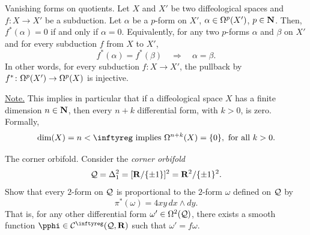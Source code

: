 \begin{Article}{Vanishing forms on quotients.}{}
  Let $X$ and $X'$ be two diffeological spaces and $f \colon X \to X'$ be a subduction.
  Let $\alpha$ be a $p$-form on $X'$,
  $\alpha \in \Omega^p(X')$,
  $p \in \mathbf{N}$.
  Then,
  $f^*(\alpha) = 0$ if and only if $\alpha = 0$.
  Equivalently,
  for any two $p$-forms $\alpha$ and $\beta$ on $X'$ and for every subduction $f$ from $X$ to $X'$,
  \begin{equation}
    \renewcommand{\theequation}{$\diamondsuit$}
    f^*(\alpha) = f^*(\beta) \quad \Rightarrow \quad \alpha = \beta.
  \end{equation}
  In other words,
  for every subduction $f \colon X \to X'$,
  the pullback by $f^* \colon \Omega^p(X') \to \Omega^p(X)$ is injective.

  \uline{Note.} This implies in particular that if a diffeological space $X$ has a finite dimension $n \in \mathbf{N}$,
  then every $n+k$ differential form,
  with $k > 0$,
  is zero.
  Formally,
  \begin{equation}
    \renewcommand{\theequation}{$\heartsuit$}
    \dim(X) = n < \infty
    \SpacedText{implies}
    \DForms^{n+k}(X) = \{0\},
    \text{ for all $k>0$.}
  \end{equation}
\end{Article}

\begin{Article}{The corner orbifold.}{}
  Consider the \emph{corner orbifold}
  $$%
    \cQ = \Delta_1^2 = [\RR/\{\pm 1\}]^2 = \RR^2/ \{\pm 1\}^2.
  $$%
  Show that every $2$-form on $\mathcal{Q}$ is proportional to the $2$-form $\omega$ defined on $\mathcal{Q}$ by
  $$%
    \pi^*(\omega) = 4xy \, dx \wedge dy.
  $$%
  That is,
  for any other differential form $\omega' \in \Omega^2(\mathcal{Q})$,
  there exists a smooth function $\pphi \in \Cinfty(\cQ,\RR)$ such that $\omega' = f \omega$.
\end{Article}

